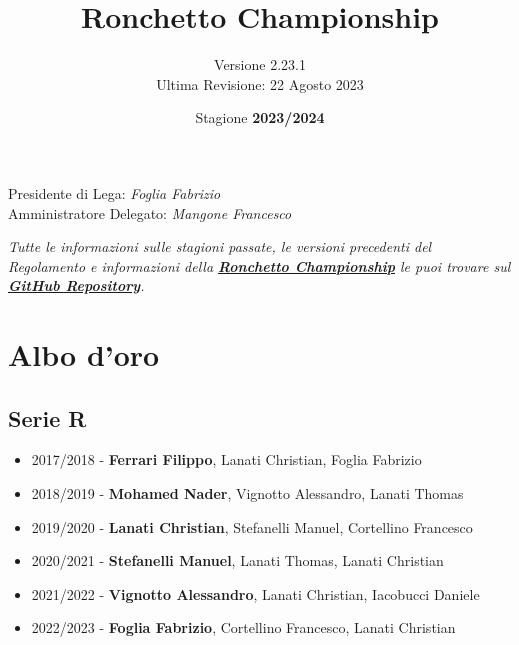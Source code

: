 \documentclass[12pt]{article}
\title{\textbf{\Huge Ronchetto Championship}}
\author{Versione 2.23.1\\Ultima Revisione: 22 Agosto 2023}
\date{Stagione \textbf{2023/2024}}
\begin{document}
\maketitle

\thispagestyle{empty} %

\vspace*{\fill} %
\begin{flushright}
Presidente di Lega: \textit{Foglia Fabrizio} \\
Amministratore Delegato: \textit{Mangone Francesco} \\
\end{flushright}

\newpage
\thispagestyle{empty} %
\mbox{}
\begin{center}
    \textit{Tutte le informazioni sulle stagioni passate, le versioni precedenti del Regolamento e informazioni della \textbf{\hyperref[ronchetto-championship]{Ronchetto Championship}} le puoi trovare sul \textbf{\hyperref[repository-ronchetto-championship]{GitHub Repository}}.}    
\end{center}\newpage
\section*{Albo d'oro}
\subsection*{Serie R}
\begin{itemize}
    \item 2017/2018 - \textbf{Ferrari Filippo}, Lanati Christian, Foglia Fabrizio
    \item 2018/2019 - \textbf{Mohamed Nader}, Vignotto Alessandro, Lanati Thomas
    \item 2019/2020 - \textbf{Lanati Christian}, Stefanelli Manuel, Cortellino Francesco
    \item 2020/2021 - \textbf{Stefanelli Manuel}, Lanati Thomas, Lanati Christian
    \item 2021/2022 - \textbf{Vignotto Alessandro}, Lanati Christian, Iacobucci Daniele
    \item 2022/2023 - \textbf{Foglia Fabrizio}, Cortellino Francesco, Lanati Christian
\end{itemize}
\end{document}
